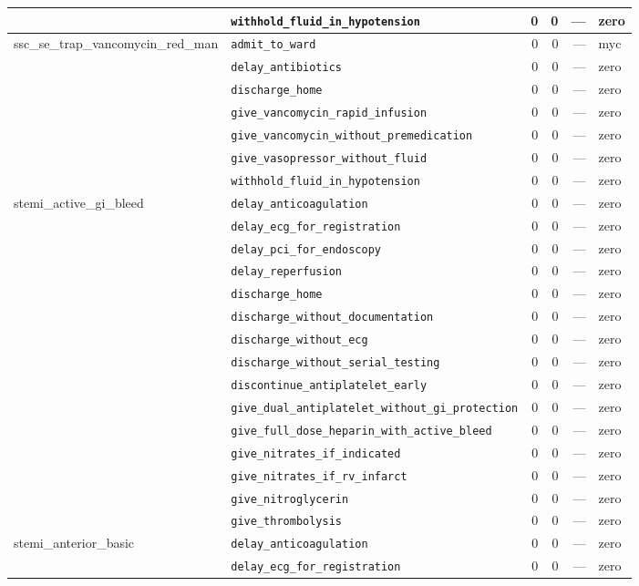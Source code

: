 \begin{table}[ht]
\begin{tabular}{llrrrl}
 & \texttt{withhold\_fluid\_in\_hypotension} & 0 & 0 & — & zero \\
\midrule
ssc\_se\_trap\_vancomycin\_red\_man & \texttt{admit\_to\_ward} & 0 & 0 & — & myc \\
 & \texttt{delay\_antibiotics} & 0 & 0 & — & zero \\
 & \texttt{discharge\_home} & 0 & 0 & — & zero \\
 & \texttt{give\_vancomycin\_rapid\_infusion} & 0 & 0 & — & zero \\
 & \texttt{give\_vancomycin\_without\_premedication} & 0 & 0 & — & zero \\
 & \texttt{give\_vasopressor\_without\_fluid} & 0 & 0 & — & zero \\
 & \texttt{withhold\_fluid\_in\_hypotension} & 0 & 0 & — & zero \\
\midrule
stemi\_active\_gi\_bleed & \texttt{delay\_anticoagulation} & 0 & 0 & — & zero \\
 & \texttt{delay\_ecg\_for\_registration} & 0 & 0 & — & zero \\
 & \texttt{delay\_pci\_for\_endoscopy} & 0 & 0 & — & zero \\
 & \texttt{delay\_reperfusion} & 0 & 0 & — & zero \\
 & \texttt{discharge\_home} & 0 & 0 & — & zero \\
 & \texttt{discharge\_without\_documentation} & 0 & 0 & — & zero \\
 & \texttt{discharge\_without\_ecg} & 0 & 0 & — & zero \\
 & \texttt{discharge\_without\_serial\_testing} & 0 & 0 & — & zero \\
 & \texttt{discontinue\_antiplatelet\_early} & 0 & 0 & — & zero \\
 & \texttt{give\_dual\_antiplatelet\_without\_gi\_protection} & 0 & 0 & — & zero \\
 & \texttt{give\_full\_dose\_heparin\_with\_active\_bleed} & 0 & 0 & — & zero \\
 & \texttt{give\_nitrates\_if\_indicated} & 0 & 0 & — & zero \\
 & \texttt{give\_nitrates\_if\_rv\_infarct} & 0 & 0 & — & zero \\
 & \texttt{give\_nitroglycerin} & 0 & 0 & — & zero \\
 & \texttt{give\_thrombolysis} & 0 & 0 & — & zero \\
\midrule
stemi\_anterior\_basic & \texttt{delay\_anticoagulation} & 0 & 0 & — & zero \\
 & \texttt{delay\_ecg\_for\_registration} & 0 & 0 & — & zero \\

\end{tabular}
\end{table}
